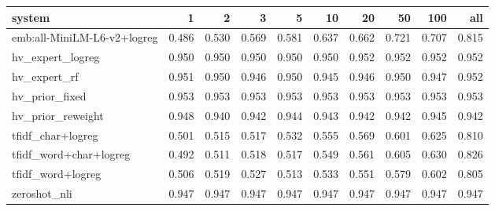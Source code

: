 \begin{tabular}{lrrrrrrrrr}
\toprule
system & 1 & 2 & 3 & 5 & 10 & 20 & 50 & 100 & all \\
\midrule
emb:all-MiniLM-L6-v2+logreg & 0.486 & 0.530 & 0.569 & 0.581 & 0.637 & 0.662 & 0.721 & 0.707 & 0.815 \\
hv\_expert\_logreg & 0.950 & 0.950 & 0.950 & 0.950 & 0.950 & 0.952 & 0.952 & 0.952 & 0.952 \\
hv\_expert\_rf & 0.951 & 0.950 & 0.946 & 0.950 & 0.945 & 0.946 & 0.950 & 0.947 & 0.952 \\
hv\_prior\_fixed & 0.953 & 0.953 & 0.953 & 0.953 & 0.953 & 0.953 & 0.953 & 0.953 & 0.953 \\
hv\_prior\_reweight & 0.948 & 0.940 & 0.942 & 0.944 & 0.943 & 0.942 & 0.942 & 0.945 & 0.942 \\
tfidf\_char+logreg & 0.501 & 0.515 & 0.517 & 0.532 & 0.555 & 0.569 & 0.601 & 0.625 & 0.810 \\
tfidf\_word+char+logreg & 0.492 & 0.511 & 0.518 & 0.517 & 0.549 & 0.561 & 0.605 & 0.630 & 0.826 \\
tfidf\_word+logreg & 0.506 & 0.519 & 0.527 & 0.513 & 0.533 & 0.551 & 0.579 & 0.602 & 0.805 \\
zeroshot\_nli & 0.947 & 0.947 & 0.947 & 0.947 & 0.947 & 0.947 & 0.947 & 0.947 & 0.947 \\
\bottomrule
\end{tabular}
